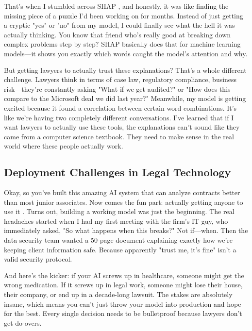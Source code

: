 That's when I stumbled across SHAP \cite{lundberg2017unified}, and honestly, it was like finding the missing piece of a puzzle I'd been working on for months. Instead of just getting a cryptic "yes" or "no" from my model, I could finally see what the hell it was actually thinking. You know that friend who's really good at breaking down complex problems step by step? SHAP basically does that for machine learning models—it shows you exactly which words caught the model's attention and why.

But getting lawyers to actually trust these explanations? That's a whole different challenge. Lawyers think in terms of case law, regulatory compliance, business risk—they're constantly asking "What if we get audited?" or "How does this compare to the Microsoft deal we did last year?" Meanwhile, my model is getting excited because it found a correlation between certain word combinations. It's like we're having two completely different conversations. I've learned that if I want lawyers to actually use these tools, the explanations can't sound like they came from a computer science textbook. They need to make sense in the real world where these people actually work.

\subsection{Deployment Challenges in Legal Technology}

Okay, so you've built this amazing AI system that can analyze contracts better than most junior associates. Now comes the fun part: actually getting anyone to use it \cite{paleyes2022challenges}. Turns out, building a working model was just the beginning. The real headaches started when I had my first meeting with the firm's IT guy, who immediately asked, "So what happens when this breaks?" Not if—when. Then the data security team wanted a 50-page document explaining exactly how we're keeping client information safe. Because apparently "trust me, it's fine" isn't a valid security protocol.

And here's the kicker: if your AI screws up in healthcare, someone might get the wrong medication. If it screws up in legal work, someone might lose their house, their company, or end up in a decade-long lawsuit. The stakes are absolutely insane, which means you can't just throw your model into production and hope for the best. Every single decision needs to be bulletproof because lawyers don't get do-overs.
